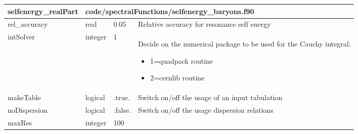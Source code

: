 \documentclass{article}
\begin{document}
\begin{longtable}{llll}
\toprule
\textbf{\large{selfenergy\_realPart}} & \multicolumn{3}{l}{\footnotesize{code/spectralFunctions/selfenergy\_baryons.f90}}\\*
\midrule
\endfirsthead
\midrule
\endhead
rel\_accuracy & \begin{minipage}[t]{2cm}real\end{minipage} & \begin{minipage}[t]{2cm}0.05\end{minipage} & \begin{minipage}[t]{12cm}Relative accuracy for resonance self energy\end{minipage}\\*
\midrule
intSolver & \begin{minipage}[t]{2cm}integer\end{minipage} & \begin{minipage}[t]{2cm}1\end{minipage} & \begin{minipage}[t]{12cm}Decide on the numerical package to be used for the Cauchy integral:\begin{itemize}\leftmargin0em\itemindent0pt\item 1=quadpack routine\item 2=cernlib routine\end{itemize}\end{minipage}\\*
\midrule
makeTable & \begin{minipage}[t]{2cm}logical\end{minipage} & \begin{minipage}[t]{2cm}.true.\end{minipage} & \begin{minipage}[t]{12cm}Switch on/off the usage of an input tabulation\end{minipage}\\*
\midrule
noDispersion & \begin{minipage}[t]{2cm}logical\end{minipage} & \begin{minipage}[t]{2cm}.false.\end{minipage} & \begin{minipage}[t]{12cm}Switch on/off the usage dispersion relations\end{minipage}\\*
\midrule
maxRes & \begin{minipage}[t]{2cm}integer\end{minipage} & \begin{minipage}[t]{2cm}100\end{minipage} & \begin{minipage}[t]{12cm}\end{minipage}\\*

\end{longtable}
\end{document}
